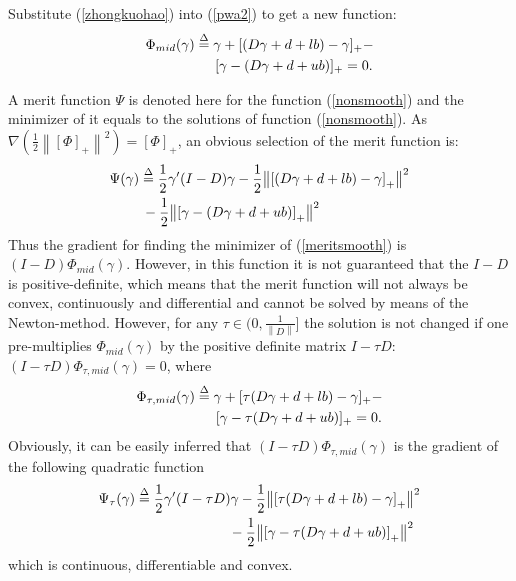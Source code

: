 \documentclass[journal]{IEEEtran}
\begin{document}
Substitute (\ref{zhongkuohao}) into (\ref{pwa2}) to get a new function:
\begin{equation}\label{nonsmooth}
\begin{aligned}
&{\Phi _{mid}}(\gamma ) \buildrel \Delta \over= \gamma  + {[ (D\gamma  + d + lb) - \gamma ]_ + } - \\
&~~~~~~~~~~~~~~~{[\gamma  -  (D\gamma  + d + ub)]_ + } =0.
\end{aligned}
\end{equation}

A merit function $\Psi $ is denoted here for the function (\ref{nonsmooth}) and the minimizer of it equals to the solutions of function (\ref{nonsmooth}). As $\nabla (\frac{1}{2}{\left\| {{{[\Phi ]}_ + }} \right\|^2}) = {[\Phi ]_ + }$, an obvious selection of the merit function is:
\begin{equation}\label{meritsmooth}
\begin{aligned}
 &{\Psi  }(\gamma ) \buildrel \Delta\over = \frac{1}{2}\gamma '( I -  D)\gamma  - \frac{1}{2}{\left\| {{{[ (D\gamma  + d + lb) - \gamma ]}_ + }} \right\|^2}\\
&~~~~~~~- \frac{1}{2}{\left\| {{{[\gamma  -  (D\gamma  + d + ub)]}_ + }} \right\|^2}
\end{aligned}
\end{equation}
Thus the gradient for finding the minimizer of (\ref{meritsmooth}) is $( I -  D){\Phi _{mid}}(\gamma )$. However, in this function it is not guaranteed that the $I - D$  is positive-definite, which means that the merit function will not always be convex, continuously and differential and cannot be solved by means of the Newton-method. However, for any $\tau\in(0,\frac{1}{{\left\| D \right\|}}] $ the solution is not changed if one pre-multiplies ${\Phi _{mid}}\left( \gamma  \right)$ by the positive definite matrix $ I - \tau D$: $( I- \tau D){\Phi _{\tau ,mid}}(\gamma ) = 0$, where
\begin{equation}\label{rewritemid}
\begin{aligned}
&{\Phi _{\tau ,mid}}(\gamma ) \buildrel \Delta \over= \gamma  + {[\tau (D\gamma  + d + lb) - \gamma ]_ + } - \\
&~~~~~~~~~~~~~~~~~{[\gamma  - \tau (D\gamma  + d + ub)]_ + } =0.
\end{aligned}
\end{equation}
Obviously, it can be easily inferred that $ (I - \tau D){\Phi _{\tau ,mid}}(\gamma )$ is the gradient of the following quadratic function
\begin{equation}\label{meritfun}
\begin{aligned}
&{\Psi _\tau }(\gamma ) \buildrel \Delta \over = \frac{1}{2}\gamma '( I - \tau D)\gamma  - \frac{1}{2}{\left\| {{{[\tau (D\gamma  + d + lb) - \gamma ]}_ + }} \right\|^2} \\
 &~~~~~~~~~~~~~~~~~~~~~~~~~~~~-\frac{1}{2}{\left\| {{{[\gamma  - \tau (D\gamma  + d + ub)]}_ + }} \right\|^2}
\end{aligned}
\end{equation}
which is continuous, differentiable and convex.
\end{document}
